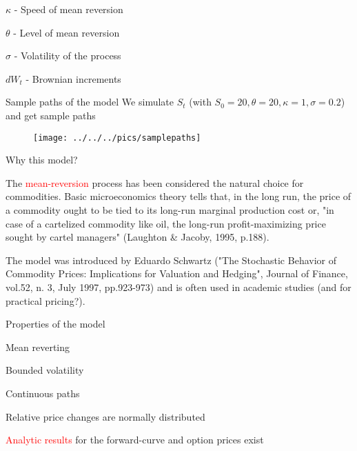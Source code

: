 {%



	$\kappa$ - Speed of mean reversion

	$\theta$ - Level of mean reversion

	$\sigma$ - Volatility of the process

	$dW_t$ - Brownian increments






{Sample paths of the model}
We simulate $S_t$ (with $S_0=20, \theta = 20, \kappa = 1, \sigma = 0.2$) and get sample paths
\begin{figure}
	\centering
		\texttt{[image: ../../../pics/samplepaths]}
	\label{fig:samplepahts}
\end{figure}

{Why this model?}






	The \textcolor{red}{mean-reversion} process has been considered the natural choice for commodities. Basic microeconomics theory tells that, in the long run, the price of a commodity ought to be tied to its long-run marginal production cost or, "in case of a cartelized commodity like oil, the long-run profit-maximizing price sought by cartel managers" (Laughton \& Jacoby, 1995, p.188).

	The model was introduced by Eduardo Schwartz ("The Stochastic Behavior of Commodity Prices: Implications for Valuation and Hedging", Journal of Finance, vol.52, n. 3, July 1997, pp.923-973) and is often used in academic studies (and for practical pricing?).






{Properties of the model}






	Mean reverting

	Bounded volatility

	Continuous paths

	Relative price changes are normally distributed

	\textcolor{red}{Analytic results} for the forward-curve and option prices exist

}
